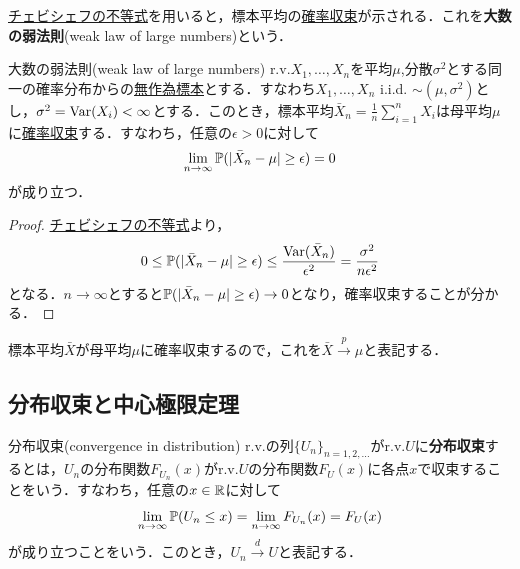 \documentclass[main.tex]{subfiles}
\begin{document}
\hyperref[lem:chebyshev_inequality]{チェビシェフの不等式}を用いると，標本平均の\hyperref[def:convergence_in_probability]{確率収束}が示される．これを\textbf{大数の弱法則}(weak law of large numbers)という．
\begin{mytheorem}{大数の弱法則(weak law of large numbers)}
\label{thm:weak_law_of_large_numbers} %
  r.v.$X_1,\dots, X_n$を平均$\mu$,分散$\sigma^2$とする同一の確率分布からの\hyperref[def:random_sample]{無作為標本}とする．すなわち$X_1,\dots,X_n$ i.i.d. $\sim (\mu, \sigma^2)$とし，$\sigma^2 = \operatorname{Var}(X_i) < \infty$とする．このとき，標本平均$\bar{X}_n = \frac{1}{n} \sum_{i=1}^{n} X_i$は母平均$\mu$に\hyperref[def:convergence_in_probability]{確率収束}する．すなわち，任意の$\epsilon >0$に対して
  \begin{equation}
    \lim_{n \to \infty} \mathbb{P}(|\bar{X}_n - \mu| \geq \epsilon) = 0
  \end{equation}
  が成り立つ．
\end{mytheorem}
\begin{proof}
\hyperref[lem:chebyshev_inequality]{チェビシェフの不等式}より，
\begin{equation}
  0 \leq \mathbb{P}(|\bar{X}_n - \mu| \geq \epsilon) \leq \frac{\operatorname{Var}(\bar{X}_n)}{\epsilon^2} = \frac{\sigma^2}{n \epsilon^2} 
  \label{eq:weak_law_of_large_numbers_proof_1}
\end{equation}
となる．$n \to \infty$とすると$\mathbb{P}(|\bar{X}_n - \mu| \geq \epsilon) \to 0$となり，確率収束することが分かる．
\end{proof}
標本平均$\bar{X}$が母平均$\mu$に確率収束するので，これを$\bar{X} \xrightarrow{p} \mu$と表記する．

\subsection{分布収束と中心極限定理}
\begin{mydefinition}{分布収束(convergence in distribution)}
\label{def:convergence_in_distribution} %
  r.v.の列$\{U_n\}_{n=1,2,\dots}$がr.v.$U$に\textbf{分布収束}するとは，$U_n$の分布関数$F_{U_n}(x)$がr.v.$U$の分布関数$F_U(x)$に各点$x$で収束することをいう．すなわち，任意の$x \in \mathbb{R}$に対して
  \begin{equation}
    \lim_{n \to \infty} \mathbb{P}(U_n \leq x) = \lim_{n \to \infty} F_{U_n}(x) = F_U(x)
  \end{equation}
  が成り立つことをいう．このとき，$U_n \xrightarrow{d} U$と表記する．
\end{mydefinition}
\end{document}
